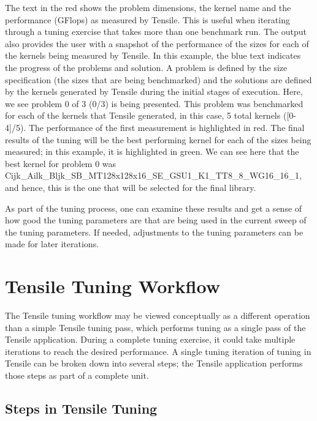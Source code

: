 \documentclass[]{article}
\begin{document}
The text in the red shows the problem dimensions, the kernel name and the performance (GFlops) as measured by Tensile. This is useful when iterating through a tuning exercise that takes more than one benchmark run. The output also provides the user with a snapshot of the performance of the sizes for each of the kernels being measured by Tensile. In this example, the blue text indicates the progress of the problems and solution. A problem is defined by the size specification (the sizes that are being benchmarked) and the solutions are defined by the kernels generated by Tensile during the initial stages of execution. Here, we see problem 0 of 3 (0/3) is being presented. This problem was benchmarked for each of the kernels that Tensile generated, in this case, 5 total kernels ([0-4]/5). The performance of the first measurement is highlighted in red. The final results of the tuning will be the best performing kernel for each of the sizes being measured; in this example, it is highlighted in green. We can see here that the best kernel for problem 0 was Cijk\_Ailk\_Bljk\_SB\_MT128x128x16\_SE\_GSU1\_K1\_TT8\_8\_WG16\_16\_1, and hence, this is the one that will be selected for the final library.

As part of the tuning process, one can examine these results and get a sense of how good the tuning parameters are that are being used in the current sweep of the tuning parameters. If needed, adjustments to the tuning parameters can be made for later iterations.

\section{Tensile Tuning Workflow}

The Tensile tuning workflow may be viewed conceptually as a different operation than a simple Tensile tuning pass, which performs tuning as a single pass of the Tensile application. During a complete tuning exercise, it could take multiple iterations to reach the desired performance. A single tuning iteration of tuning in Tensile can be broken down into several steps; the Tensile application performs those steps as part of a complete unit.

\subsection{Steps in Tensile Tuning}
\end{document}
